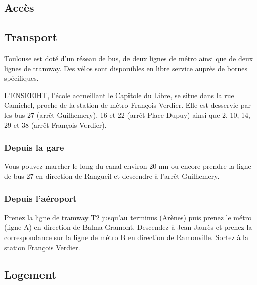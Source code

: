 
\subsection{Accès}


\subsection{Transport}

Toulouse est doté d'un réseau de bus, de deux lignes de métro ainsi que de
deux lignes de tramway. Des vélos sont disponibles en libre service auprès
de bornes spécifiques.

L'ENSEEIHT, l'école accueillant le Capitole du Libre, se situe dans la rue
Camichel, proche de la station de métro François Verdier. Elle est desservie
par les bus 27 (arrêt Guilhemery), 16 et 22 (arrêt Place Dupuy) ainsi que 2,
10, 14, 29 et 38 (arrêt François Verdier).

\subsubsection*{Depuis la gare}

Vous pouvez marcher le long du canal environ 20 mn ou encore prendre la
ligne de bus 27 en direction de Rangueil et descendre à l'arrêt Guilhemery.

\subsubsection*{Depuis l'aéroport}

Prenez la ligne de tramway T2 jusqu'au terminus (Arènes) puis prenez le métro
(ligne A) en direction de Balma-Gramont. Descendez à Jean-Jaurès et prenez
la correspondance sur la ligne de métro B en direction de Ramonville. Sortez
à la station François Verdier.

\subsection{Logement}


